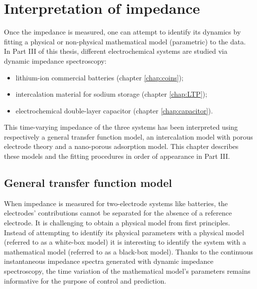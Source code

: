 \chapter{Interpretation of impedance}
\label{chap:analysis}

Once the impedance is measured, one can attempt to identify its dynamics by fitting a physical or non-physical mathematical model (parametric) to the data. 
In Part III of this thesis, different electrochemical systems are studied via dynamic impedance spectroscopy:
\begin{itemize}
\item lithium-ion commercial batteries (chapter \ref{chap:coins}); 
\item intercalation material for sodium storage (chapter \ref{chap:LTP}); 
\item electrochemical double-layer capacitor (chapter \ref{chap:capacitor}).
\end{itemize}
This time-varying impedance of the three systems has been interpreted using respectively a general transfer function model, an intercalation model with porous electrode theory and a nano-porous adsorption model.
This chapter describes these models and the fitting procedures in order of appearance in Part III.

\section{General transfer function model}

When impedance is measured for two-electrode systems like batteries, the electrodes' contributions cannot be separated for the absence of a reference electrode. It is challenging to obtain a physical model from first principles.
Instead of attempting to identify its physical parameters with a physical model (referred to as a white-box model) it is interesting to identify the system with a mathematical model (referred to as a black-box model). 
Thanks to the continuous instantaneous impedance spectra generated with dynamic impedance spectroscopy, the time variation of the mathematical model's parameters remains informative for the purpose of control and prediction. 

